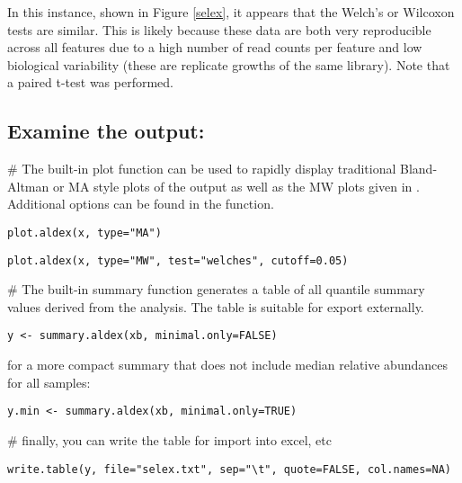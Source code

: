 \documentclass[11pt]{amsart}
\begin{document}
\vspace{12pt}
In this instance,  shown in Figure \ref{selex}, it appears that the Welch's or Wilcoxon tests  are similar. This is likely because these data are both very reproducible across all features due to a high number of read counts per feature and low biological variability (these are replicate growths of the same library). Note that a paired t-test was performed.

\subsection*{Examine the output:}
\noindent\#  The built-in plot function can be used to rapidly display traditional Bland-Altman or MA style plots of the output as well as the MW plots given in \cite{fernandes:2013}. Additional options can be found in the function.\\
\noindent\begin{verbatim}plot.aldex(x, type="MA")\end{verbatim}
\noindent\begin{verbatim}plot.aldex(x, type="MW", test="welches", cutoff=0.05)\end{verbatim}

\noindent\#  The built-in summary function generates a table of all quantile summary values derived from the analysis. The table is suitable for export externally. \\

\noindent\begin{verbatim}y <- summary.aldex(xb, minimal.only=FALSE)\end{verbatim}
for a more compact summary that does not include median relative abundances for all samples:\\
\noindent\begin{verbatim}y.min <- summary.aldex(xb, minimal.only=TRUE)\end{verbatim}

\noindent\# finally, you can write the table for import into excel, etc\\
\begin{verbatim}write.table(y, file="selex.txt", sep="\t", quote=FALSE, col.names=NA)\end{verbatim}
\end{document}
